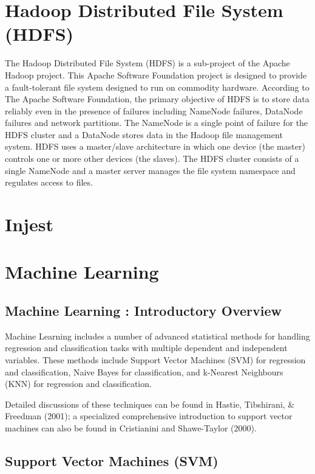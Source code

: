 \documentclass[11pt]{article} %
\begin{document}
\newpage
\section{Hadoop Distributed File System (HDFS)}
The Hadoop Distributed File System (HDFS) is a sub-project of the Apache Hadoop project. This Apache Software Foundation project is designed to provide a fault-tolerant file system designed to run on commodity hardware.
According to The Apache Software Foundation, the primary objective of HDFS is to store data reliably even in the presence of failures including NameNode failures, DataNode failures and network partitions. The NameNode is a single point of failure for the HDFS cluster and a DataNode stores data in the Hadoop file management system.
HDFS uses a master/slave architecture in which one device (the master) controls one or more other devices (the slaves). The HDFS cluster consists of a single NameNode and a master server manages the file system namespace and regulates access to files.

\newpage
\section{Injest}
\newpage

\section{Machine Learning}



\subsection{Machine Learning : Introductory Overview}

Machine Learning includes a number of advanced statistical methods for handling regression and classification tasks with multiple dependent and independent variables. These methods include Support Vector Machines (SVM) for regression and classification, Naive Bayes for classification, and k-Nearest Neighbours (KNN) for regression and classification.

Detailed discussions of these techniques can be found in Hastie, Tibshirani, \& Freedman (2001); a specialized comprehensive introduction to support vector machines can also be found in Cristianini and Shawe-Taylor (2000).


\subsection{Support Vector Machines (SVM)}
\end{document}
